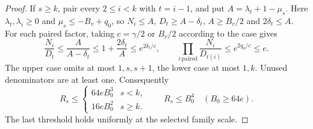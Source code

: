\begin{proof}
If \(s\ge k\), pair every \(2\le i<k\) with \(t=i-1\), and put
\(A=\lambda_t+1-\mu_s\). Here \(\lambda_t,\lambda_i\ge0\) and
\(\mu_s\le-B_v+q_0\), so \(N_i\le A\), \(D_t\ge A-\delta_t\),
\(A\ge B_v/2\) and \(2\delta_t\le A\).
For each paired factor, taking \(c=\gamma/2\) or \(B_v/2\)
according to the case gives
\[
 \frac{N_i}{D_t}\le\frac{A}{A-\delta_t}
      \le 1+\frac{2\delta_t}{A}
      \le e^{2\delta_t/c},\qquad
 \prod_{i\,\mathrm{paired}}\frac{N_i}{D_{t(i)}}\le e^{2q_0/c}\le e .
\]
The upper case omits at most \(1,s,s+1\), the lower case at most
\(1,k\). Unused denominators are at least one. Consequently
\[
 R_s\le
 \begin{cases}64e B_0^3&s<k,\\16e B_0^2&s\ge k.\end{cases}
 \qquad R_s\le B_0^4\quad(B_0\ge64e).
\]
The last threshold holds uniformly at the selected family scale.
\end{proof}
